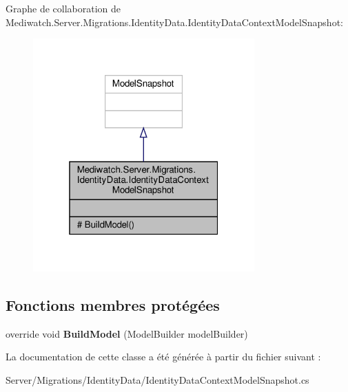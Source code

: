 Graphe de collaboration de Mediwatch.\+Server.\+Migrations.\+Identity\+Data.\+Identity\+Data\+Context\+Model\+Snapshot\+:\nopagebreak
\begin{figure}[H]
\begin{center}
\leavevmode
\includegraphics[width=241pt]{class_mediwatch_1_1_server_1_1_migrations_1_1_identity_data_1_1_identity_data_context_model_snapshot__coll__graph}
\end{center}
\end{figure}
\subsection*{Fonctions membres protégées}
\begin{DoxyCompactItemize}
\item 
\mbox{\label{class_mediwatch_1_1_server_1_1_migrations_1_1_identity_data_1_1_identity_data_context_model_snapshot_ace9e9c05682cf740c45eeef4862fa09d}} 
override void {\bfseries Build\+Model} (Model\+Builder model\+Builder)
\end{DoxyCompactItemize}


La documentation de cette classe a été générée à partir du fichier suivant \+:\begin{DoxyCompactItemize}
\item 
Server/\+Migrations/\+Identity\+Data/Identity\+Data\+Context\+Model\+Snapshot.\+cs\end{DoxyCompactItemize}
